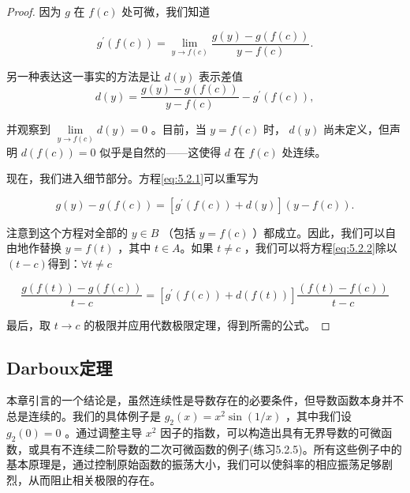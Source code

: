 \begin{proof}
因为 \(g\) 在 \(f\left( c\right)\) 处可微，我们知道

\[
{g}^{\prime }\left( {f\left( c\right) }\right)  = \mathop{\lim }\limits_{{y \rightarrow  f\left( c\right) }}\frac{g\left( y\right)  - g\left( {f\left( c\right) }\right) }{y - f\left( c\right) }.
\]

另一种表达这一事实的方法是让 \(d\left( y\right)\) 表示差值
\begin{equation}
\label{eq:5.2.1}
d\left( y\right)  = \frac{g\left( y\right)  - g\left( {f\left( c\right) }\right) }{y - f\left( c\right) } - {g}^{\prime }\left( {f\left( c\right) }\right) ,
\end{equation}

并观察到 \(\mathop{\lim }\limits_{{y \rightarrow  f\left( c\right) }}d\left( y\right)  = 0\) 。目前，当 \(y = f\left( c\right)\) 时， \(d\left( y\right)\) 尚未定义，但声明 \(d\left( {f\left( c\right) }\right)  = 0\) 似乎是自然的——这使得 \(d\) 在 \(f\left( c\right)\) 处连续。

现在，我们进入细节部分。方程\eqref{eq:5.2.1}可以重写为

\begin{equation}
\label{eq:5.2.2}
g\left( y\right)  - g\left( {f\left( c\right) }\right)  = \left\lbrack  {{g}^{\prime }\left( {f\left( c\right) }\right)  + d\left( y\right) }\right\rbrack  \left( {y - f\left( c\right) }\right) .
\end{equation}

注意到这个方程对全部的 \(y \in  B\) （包括 \(y = f\left( c\right)\) ）都成立。因此，我们可以自由地作替换 \(y = f\left( t\right)\) ，其中 $t\in A$。如果 \(t \neq  c\) ，我们可以将方程\eqref{eq:5.2.2}除以$(t - c)$得到：$\forall t\ne c$

\[
\frac{g\left( {f\left( t\right) }\right)  - g\left( {f\left( c\right) }\right) }{t - c} = \left\lbrack  {{g}^{\prime }\left( {f\left( c\right) }\right)  + d\left( {f\left( t\right) }\right) }\right\rbrack  \frac{\left( f\left( t\right)  - f\left( c\right) \right) }{t - c}
\]

最后，取 \(t \rightarrow  c\) 的极限并应用代数极限定理，得到所需的公式。  
\end{proof}

\subsection{Darboux定理}

本章引言的一个结论是，虽然连续性是导数存在的必要条件，但导数函数本身并不总是连续的。我们的具体例子是 \({g}_{2}\left( x\right)  = {x}^{2}\sin \left( {1/x}\right)\) ，其中我们设 \({g}_{2}\left( 0\right)  = 0\) 。通过调整主导 \({x}^{2}\) 因子的指数，可以构造出具有无界导数的可微函数，或具有不连续二阶导数的二次可微函数的例子(练习5.2.5)。所有这些例子中的基本原理是，通过控制原始函数的振荡大小，我们可以使斜率的相应振荡足够剧烈，从而阻止相关极限的存在。

